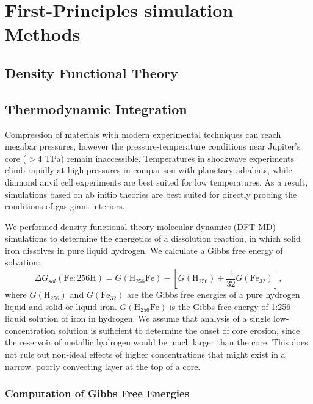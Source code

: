 \chapter{First-Principles simulation Methods}\label{chap2}

\section{Density Functional Theory}

\section{Thermodynamic Integration}


Compression of materials with modern experimental techniques can reach megabar
pressures, however the pressure-temperature conditions near Jupiter's core ($>$4 TPa) remain
inaccessible. Temperatures in shockwave experiments climb rapidly at high
pressures in comparison with planetary adiabats, while diamond anvil cell
experiments
are best suited for low temperatures. As a result, simulations based on ab 
initio theories are best suited for directly probing the conditions of gas 
giant interiors.


We performed density functional theory molecular dynamics (DFT-MD) simulations
to determine the energetics of a dissolution reaction, in which solid iron
dissolves in pure liquid hydrogen. We calculate a Gibbs free energy of
solvation:
\begin{equation}
  \Delta G_{sol}\left(\mathrm{Fe}:256\mathrm{H}\right) = G\left(\mathrm{H}_{256}\mathrm{Fe}\right) -
  \left[ G\left(\mathrm{H}_{256}\right) +
    \frac{1}{32}G\left(\mathrm{Fe}_{32}\right) \right]\mathrm{,}
\end{equation}
where $G\left(\mathrm{H}_{256}\right)$ and $G\left(\mathrm{Fe}_{32}\right)$
are the Gibbs free
energies of a pure hydrogen liquid and solid or liquid iron.
$G\left(\mathrm{H}_{256}\mathrm{Fe}\right)$ is the Gibbs free energy of 1:256 liquid solution of iron
in hydrogen. We assume that analysis of a single low-concentration solution is
sufficient to determine the onset of core erosion, since the reservoir of
metallic hydrogen would be much larger than the core. This does not rule out
non-ideal effects of higher concentrations that might exist in a narrow,
poorly convecting layer at the top of a core. 

\subsection{Computation of Gibbs Free Energies}


